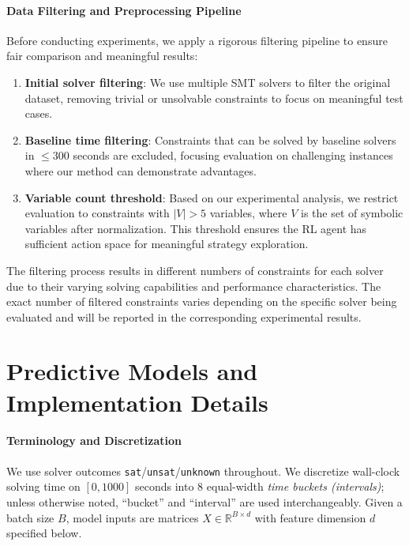 \documentclass[acmsmall,screen,review,anonymous]{acmart}
\begin{document}
\paragraph{Data Filtering and Preprocessing Pipeline}
Before conducting experiments, we apply a rigorous filtering pipeline to ensure fair comparison and meaningful results:
\begin{enumerate}
    \item \textbf{Initial solver filtering}: We use multiple SMT solvers to filter the original dataset, removing trivial or unsolvable constraints to focus on meaningful test cases.
    \item \textbf{Baseline time filtering}: Constraints that can be solved by baseline solvers in $\leq 300$ seconds are excluded, focusing evaluation on challenging instances where our method can demonstrate advantages.
    \item \textbf{Variable count threshold}: Based on our experimental analysis, we restrict evaluation to constraints with $|V| > 5$ variables, where $V$ is the set of symbolic variables after normalization. This threshold ensures the RL agent has sufficient action space for meaningful strategy exploration.
\end{enumerate}

The filtering process results in different numbers of constraints for each solver due to their varying solving capabilities and performance characteristics. The exact number of filtered constraints varies depending on the specific solver being evaluated and will be reported in the corresponding experimental results.

\section{Predictive Models and Implementation Details}
\label{sec:appendix-predictors}

\paragraph{Terminology and Discretization}
We use solver outcomes \texttt{sat}/\texttt{unsat}/\texttt{unknown} throughout. We discretize wall-clock solving time on $[0,1000]$ seconds into 8 equal-width \emph{time buckets (intervals)}; unless otherwise noted, ``bucket'' and ``interval'' are used interchangeably. Given a batch size $B$, model inputs are matrices $X\in\mathbb{R}^{B\times d}$ with feature dimension $d$ specified below.
\end{document}
